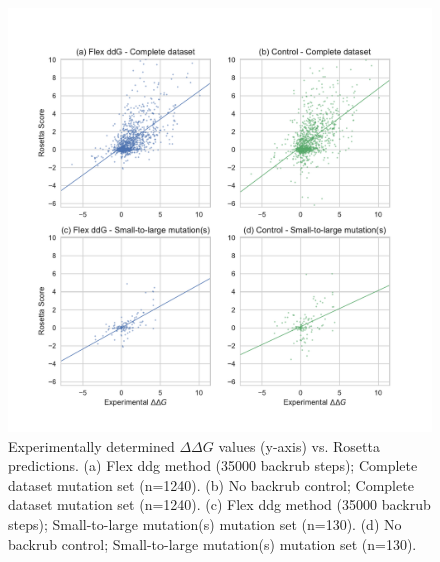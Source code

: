 \begin{figure}
  \includegraphics[width=\textwidth,keepaspectratio]{fig-scatter.pdf}
  \caption[]{ %
    Experimentally determined $\Delta\Delta G$ values (y-axis) vs. Rosetta predictions.
    (a) Flex ddg method (35000 backrub steps); Complete dataset mutation set (n=1240).
    (b) No backrub control; Complete dataset mutation set (n=1240).
    (c) Flex ddg method (35000 backrub steps); Small-to-large mutation(s) mutation set (n=130).
    (d) No backrub control; Small-to-large mutation(s) mutation set (n=130).
  } \label{fig:figure-scatter}
\end{figure}
